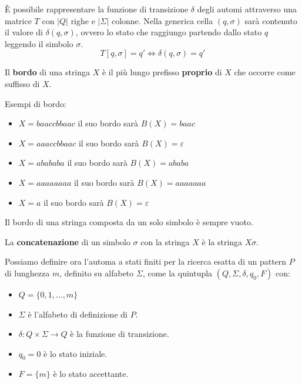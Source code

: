È possibile rappresentare la funzione di transizione $\delta$ degli automi
attraverso una matrice $T$ con $|Q|$ righe e $|\Sigma|$ colonne. Nella generica
cella $(q, \sigma)$ sarà contenuto il valore di $\delta(q, \sigma)$, ovvero lo
stato che raggiungo partendo dallo stato $q$ leggendo il simbolo $\sigma$.
\begin{equation}
    T[q,\sigma] = q' \iff \delta(q,\sigma) = q'
\end{equation}
\begin{definizione} \label{def:bordo}
    Il \textbf{bordo} di una stringa $X$ è il più lungo prefisso \textbf{proprio}
    di $X$ che occorre come suffisso di $X$.
\end{definizione}
\begin{esempio}
    Esempi di bordo:
    \begin{itemize}
        \item $X = baaccbbaac$ il suo bordo sarà $B(X) = baac$
        \item $X = aaaccbbaac$ il suo bordo sarà $B(X) = \varepsilon$
        \item $X = abababa$ il suo bordo sarà $B(X) = ababa$
        \item $X = aaaaaaaa$ il suo bordo sarà $B(X) = aaaaaaa$
        \item $X = a$ il suo bordo sarà $B(X) = \varepsilon$
    \end{itemize}
\end{esempio}
\begin{nota}
    Il bordo di una stringa composta da un solo simbolo è sempre vuoto.
\end{nota}
\begin{definizione}
    La \textbf{concatenazione} di un simbolo $\sigma$ con la stringa $X$ è la
    stringa $X\sigma$.
\end{definizione}
Possiamo definire ora l'automa a stati finiti per la ricerca esatta di un pattern
$P$ di lunghezza $m$, definito su alfabeto $\Sigma$, come la quintupla $(Q, \Sigma,
    \delta, q_0, F)$ con:
\begin{itemize}
    \item $Q = \{0, 1, \dots, m\}$
    \item $\Sigma$ è l'alfabeto di definizione di $P$.
    \item $\delta: Q \times \Sigma \to Q$ è la funzione di transizione.
    \item $q_0 = 0$ è lo stato iniziale.
    \item $F = \{m\}$ è lo stato accettante.
\end{itemize}
